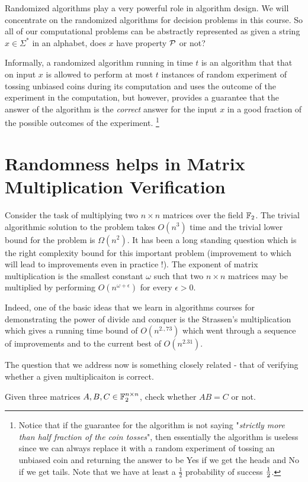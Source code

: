 \noindent 

Randomized algorithms play a very powerful role in algorithm design. We will concentrate on the randomized algorithms for decision problems in this course. So all of our computational problems can be abstractly represented as given a string $x \in \Sigma^*$ in an alphabet, does $x$ have property ${\cal P}$ or not?

Informally, a randomized algorithm running in time $t$ is an algorithm that that on input $x$ is allowed to perform at most $t$ instances of random experiment of tossing unbiased coins during its computation and uses the outcome of the experiment in the computation, but however, provides a guarantee that the answer of the algorithm is the \textit{correct} answer for the input $x$ in a good fraction of the possible outcomes of the experiment. \footnote{Notice that if the guarantee for the algorithm is not saying "{\em strictly more than half fraction of the coin tosses}", then essentially the algorithm is useless since we can always replace it with a random experiment of tossing an unbiased coin and returning the answer to be {\sc Yes} if we get the heads and {\sc No} if we get tails. Note that we have at least a $\frac{1}{2}$ probability of success $\frac{1}{2}$.}


\section{Randomness helps in Matrix Multiplication Verification}

Consider the task of multiplying two $n \times n$ matrices over the field ${\mathbb{F}}_2$. The trivial algorithmic solution to the problem takes $O(n^3)$ time and the trivial lower bound for the problem is $\Omega(n^2)$. It has been a long standing question which is the right complexity bound for this important problem (improvement to which will lead to improvements even in practice !). The exponent of matrix multiplication is the smallest constant $\omega$ such that two $n \times n$ matrices may be multiplied by performing $O(n^{\omega+\epsilon})$ for every $\epsilon > 0$.

Indeed, one of the basic ideas that we learn in algorithms courses for demonstrating the power of divide and conquer is the Strassen's multiplication which gives a running time bound of $O(n^{2.,73})$ which went through a sequence of improvements and to the current best of $O(n^{2.31})$.

The question that we address now is something closely related - that of verifying whether a given multiplicaiton is correct.
\begin{problem}
Given three matrices $A,B, C \in {\mathbb{F}}_2^{n \times n}$, check whether $AB = C$ or not.
\end{problem}

